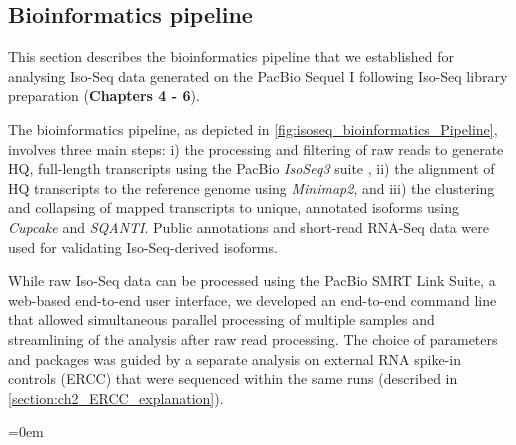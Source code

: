 \clearpage
\subsection{Bioinformatics pipeline} 
\label{section:isoseq_bioinformatics}
This section describes the bioinformatics pipeline that we established for analysing Iso-Seq data generated on the PacBio Sequel I following Iso-Seq library preparation (\textbf{Chapters 4 - 6}). 

The bioinformatics pipeline, as depicted in \cref{fig:isoseq_bioinformatics_Pipeline}, involves three main steps: i) the processing and filtering of raw reads to generate HQ, full-length transcripts using the PacBio \textit{IsoSeq3} suite \cite{Gordon2015}, ii) the alignment of HQ transcripts to the reference genome using \textit{Minimap2}\cite{Li2018}, and iii) the clustering and collapsing of mapped transcripts to unique, annotated isoforms using \textit{Cupcake}\cite{TsengCupcake} and \textit{SQANTI}\cite{Tardaguila2018}. Public annotations and short-read RNA-Seq data were used for validating Iso-Seq-derived isoforms. 

While raw Iso-Seq data can be processed using the PacBio SMRT Link Suite, a web-based end-to-end user interface, we developed an end-to-end command line that allowed simultaneous parallel processing of multiple samples and streamlining of the analysis after raw read processing. The choice of parameters and packages was guided by a separate analysis on external RNA spike-in controls (ERCC) that were sequenced within the same runs (described in \cref{section:ch2_ERCC_explanation}). 

\begingroup
\parindent=0em
\localtableofcontents 
\endgroup


